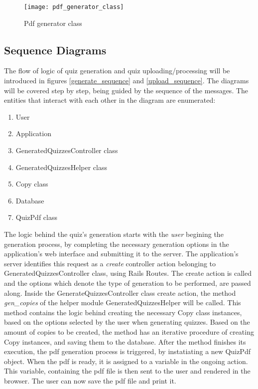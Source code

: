 \begin{figure}[!ht]
\centering
\texttt{[image: pdf\_generator\_class]}
\caption{Pdf generator class}\label{pdf_class}
\end{figure}

\subsection{Sequence Diagrams}
The flow of logic of quiz generation and quiz uploading/processing will be introduced in figures \ref{generate_sequence} and \ref{upload_sequence}. The diagrams will be covered step by step, being guided by the sequence of the messages. The entities that interact with each other in the diagram are enumerated:
\begin{enumerate} 
  \item User
  \item Application
  \item GeneratedQuizzesController class
  \item GeneratedQuizzesHelper class
  \item Copy class
  \item Database
  \item QuizPdf class
\end{enumerate}

The logic behind the quiz's generation starts with the \textit{user} begining the generation process, by completing the necessary generation options in the application's web interface and submitting it to the server. The application's server identifies this request as a \textit{create} controller action belonging to GeneratedQuizzesController class, using Rails Routes. The create action is called and the options which denote the type of generation to be performed, are passed along. Inside the GenerateQuizzesController class create action, the method \textit{gen\_copies} of the helper module GeneratedQuizzesHelper will be called. This method contains the logic behind creating the necessary Copy class instances, based on the options selected by the user when generating quizzes. Based on the amount of copies to be created, the method has an iterative procedure of creating Copy instances, and saving them to the database. After the method finishes its execution, the pdf generation process is triggered, by instatiating a new QuizPdf object. When the pdf is ready, it is assigned to a variable in the ongoing action. This variable, containing the pdf file is then sent to the user and rendered in the browser. The user can now save the pdf file and print it.

